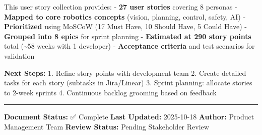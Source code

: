 \documentclass[
]{article}
\begin{document}
This user story collection provides: - \textbf{27 user stories} covering
8 personas - \textbf{Mapped to core robotics concepts} (vision,
planning, control, safety, AI) - \textbf{Prioritized} using MoSCoW (17
Must Have, 10 Should Have, 5 Could Have) - \textbf{Grouped into 8 epics}
for sprint planning - \textbf{Estimated at 290 story points} total
(\textasciitilde58 weeks with 1 developer) - \textbf{Acceptance
criteria} and test scenarios for validation

\textbf{Next Steps:} 1. Refine story points with development team 2.
Create detailed tasks for each story (subtasks in Jira/Linear) 3. Sprint
planning: allocate stories to 2-week sprints 4. Continuous backlog
grooming based on feedback

\begin{center}\rule{0.5\linewidth}{0.5pt}\end{center}

\textbf{Document Status:} ✅ Complete \textbf{Last Updated:} 2025-10-18
\textbf{Author:} Product Management Team \textbf{Review Status:} Pending
Stakeholder Review
\end{document}
